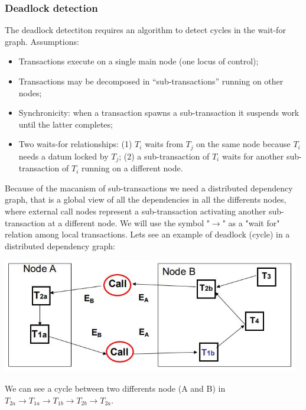 \subsubsection{Deadlock detection}
The deadlock detectiton requires an algorithm to detect cycles in the wait-for graph.\newline
\newline
Assumptions:
\begin{itemize}
    \item Transactions execute on a single main node (one locus of
    control);
    \item Transactions may be decomposed in “sub-transactions”
    running on other nodes;
    \item Synchronicity: when a transaction spawns a sub-transaction it
    suspends work until the latter completes;
    \item Two waits-for relationships: (1) $T_i$ waits from $T_j$ on the same node because $T_i$ needs a datum locked by $T_j$; (2) a sub-transaction of $T_i$ waits for another sub-transaction of $T_i$ running on a different node.
\end{itemize}
Because of the macanism of sub-transactions we need a distributed dependency graph, that is a global view of all the dependencies in all the differents nodes, where external call nodes represent a sub-transaction activating another sub-transaction at a different node.\newline
\newline
We will use the symbol "$\rightarrow$" as a "wait for" relation among local transactions.\newline
\newline
Lets see an example of deadlock (cycle) in a distributed dependency graph:
\begin{center}
    \includegraphics[height=5cm]{../arguments/distributeddependencygraph.JPG}
\end{center}
We can see a cycle between two differents node (A and B) in $T_{2a} \rightarrow T_{1a} \rightarrow T_{1b} \rightarrow T_{2b} \rightarrow T_{2a}$.\newline
